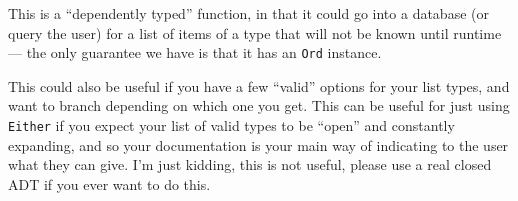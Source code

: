 \documentclass[]{article}
\newenvironment{Shaded}{}{}
\newcommand{\DataTypeTok}[1]{\textcolor[rgb]{0.56,0.13,0.00}{#1}}
\newcommand{\FunctionTok}[1]{\textcolor[rgb]{0.02,0.16,0.49}{#1}}
\newcommand{\KeywordTok}[1]{\textcolor[rgb]{0.00,0.44,0.13}{\textbf{#1}}}
\newcommand{\NormalTok}[1]{#1}
\newcommand{\OperatorTok}[1]{\textcolor[rgb]{0.40,0.40,0.40}{#1}}
\newcommand{\OtherTok}[1]{\textcolor[rgb]{0.00,0.44,0.13}{#1}}
\newcommand{\StringTok}[1]{\textcolor[rgb]{0.25,0.44,0.63}{#1}}
\begin{document}
This is a ``dependently typed'' function, in that it could go into a database
(or query the user) for a list of items of a type that will not be known until
runtime --- the only guarantee we have is that it has an \texttt{Ord} instance.

\begin{Shaded}
\end{Shaded}

This could also be useful if you have a few ``valid'' options for your list
types, and want to branch depending on which one you get. This can be useful for
just using \texttt{Either} if you expect your list of valid types to be ``open''
and constantly expanding, and so your documentation is your main way of
indicating to the user what they can give. I'm just kidding, this is not useful,
please use a real closed ADT if you ever want to do this.
\end{document}
